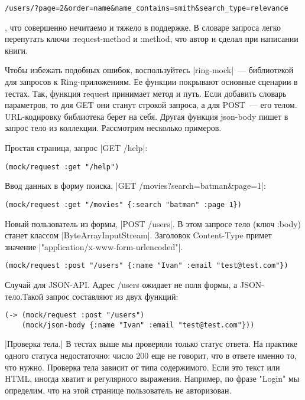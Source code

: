 \begin{verbatim}
/users/?page=2&order=name&name_contains=smith&search_type=relevance
\end{verbatim}

, что совершенно нечитаемо и тяжело в поддержке. В словаре запроса легко
перепутать ключи :request-method и :method, что автор и сделал при написании
книги.

Чтобы избежать подобных ошибок, воспользуйтесь \spverb|ring-mock|~--- библиотекой для
запросов к Ring-приложениям. Ее функции покрывают основные сценарии в
тестах. Так, функция request принимает метод и путь. Если добавить словарь
параметров, то для GET они станут строкой запроса, а для POST~--- его
телом. URL-кодировку библиотека берет на себя. Другая функция json-body пишет в
запрос тело из коллекции. Рассмотрим несколько примеров.

Простая страница, запрос \spverb|GET /help|:

\begin{verbatim}
(mock/request :get "/help")
\end{verbatim}

Ввод данных в форму поиска, \spverb|GET /movies?search=batman&page=1|:

\begin{verbatim}
(mock/request :get "/movies" {:search "batman" :page 1})
\end{verbatim}

Новый пользователь из формы, \spverb|POST /users|. В этом запросе тело (ключ :body)
станет классом \spverb|ByteArrayInputStream|. Заголовок Content-Type примет значение
\spverb|"application/x-www-form-urlencoded"|.

\begin{verbatim}
(mock/request :post "/users" {:name "Ivan" :email "test@test.com"})
\end{verbatim}

Случай для JSON-API. Адрес /users ожидает не поля формы, а JSON-тело.Такой
запрос составляют из двух функций:

\begin{verbatim}
(-> (mock/request :post "/users")
    (mock/json-body {:name "Ivan" :email "test@test.com"}))
\end{verbatim}

\spverb|Проверка тела.| В тестах выше мы проверяли только статус ответа. На практике
одного статуса недостаточно: число 200 еще не говорит, что в ответе именно то,
что нужно. Проверка тела зависит от типа содержимого. Если это текст или HTML,
иногда хватит и регулярного выражения. Например, по фразе "Login" мы определим,
что на этой странице пользователь не авторизован.

